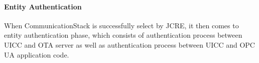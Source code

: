 \documentclass[]{llncs}
\begin{document}
\begin{table}[h]
\caption{Verify response APDU}
\label{verify-response-apdu}
\end{table}

\paragraph{Entity Authentication}
When CommunicationStack is successfully select by JCRE, it then comes to entity authentication phase, which consists of authentication process between UICC and OTA server as well as authentication process between UICC and OPC UA application code.






\end{document}
